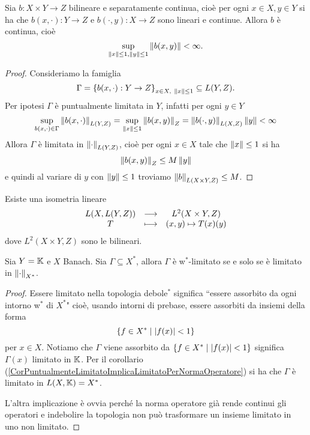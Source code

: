 \begin{proposition}\label{PrBilineareSeparatamenteContinuaEContinua}
Sia $b:X\times Y\to Z$ bilineare e separatamente continua, cio\`e per ogni $x\in X, y\in Y$ si ha che $b(x,\cdot):Y\to Z$ e $b(\cdot, y):X\to Z$ sono lineari e continue. Allora $b$ \`e continua, cio\`e
\[\sup_{\left\Vert{x}\right\Vert\leq 1, \left\Vert{y}\right\Vert\leq 1}\left\Vert{b(x,y)}\right\Vert<\infty.\]
\end{proposition}
\begin{proof}
Consideriamo la famiglia
\[\Gamma=\left\{{b(x,\cdot):Y\to Z}\right\}_{x\in X,\ \left\Vert{x}\right\Vert\leq 1}\subseteq L(Y,Z).\]
Per ipotesi $\Gamma$ \`e puntualmente limitata in $Y$, infatti per ogni $y\in Y$
\[\sup_{b(x,\cdot)\in\Gamma} \left\Vert{b(x,\cdot)}\right\Vert_{L(Y,Z)}=\sup_{\left\Vert{x}\right\Vert\leq 1}\left\Vert{b(x,y)}\right\Vert_Z= \left\Vert{b(\cdot,y)}\right\Vert_{L(X,Z)}\left\Vert{y}\right\Vert<\infty\]
Allora $\Gamma$ \`e limitata in ${\left\Vert{\cdot}\right\Vert}_{L(Y,Z)}$, cio\`e per ogni $x\in X$ tale che $\left\Vert{x}\right\Vert\leq 1$ si ha
\[\left\Vert{b(x,y)}\right\Vert_Z\leq M\left\Vert{y}\right\Vert\]
e quindi al variare di $y$ con $\left\Vert{y}\right\Vert\leq 1$ troviamo $\left\Vert{b}\right\Vert_{L(X\times Y,Z)}\leq M$.
\end{proof}

\begin{exercise}
Esiste una isometria lineare
\[\begin{array}{ccc} {L(X,L(Y,Z))} & \longrightarrow & {L^2(X\times Y,Z)}\\ {T} & \longmapsto & {(x,y)\mapsto T(x)(y)} \end{array}\]
dove $L^2(X\times Y,Z)$ sono le bilineari.
\end{exercise}

\begin{proposition}\label{PrLimitatoInDeboleStarEquivaleLimitatoInNormaDuale}
Sia $Y=\mathbb{K}$ e $X$ Banach. Sia $\Gamma\subseteq X^\ast$, allora $\Gamma$ \`e w$^\ast$-limitato se e solo se \`e limitato in ${\left\Vert{\cdot}\right\Vert}_{X^\ast}$.
\end{proposition}
\begin{proof}
Essere limitato nella topologia debole$^\ast$ significa ``essere assorbito da ogni intorno w$^\ast$ di $X^\ast$" cio\`e, usando intorni di prebase, essere assorbiti da insiemi della forma
\[\left\{{f\in X^\ast\mid \left|{f(x)}\right|<1}\right\}\]
per $x\in X$. Notiamo che $\Gamma$ viene assorbito da $\left\{{f\in X^\ast\mid \left|{f(x)}\right|<1}\right\}$ significa $\Gamma(x)$ limitato in $\mathbb{K}$. Per il corollario (\ref{CorPuntualmenteLimitatoImplicaLimitatoPerNormaOperatore}) si ha che $\Gamma$ \`e limitato in $L(X,\mathbb{K})=X^\ast$.

L'altra implicazione \`e ovvia perch\'e la norma operatore gi\`a rende continui gli operatori e indebolire la topologia non pu\`o trasformare un insieme limitato in uno non limitato.
\end{proof}

